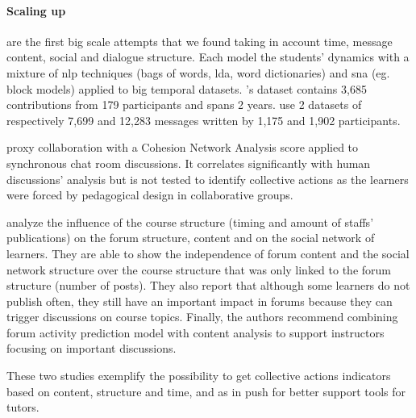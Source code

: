\documentclass[a4paper,twoside]{article}
\begin{document}
\paragraph{Scaling up}

\cite{Dascalu2017,Boroujeni2017} are the first big scale attempts that we found taking in account time, message content, social and dialogue structure.  Each model the students' dynamics with a mixture of \gls{nlp} techniques (bags of words, \gls{lda}, word dictionaries) and \gls{sna} (eg. block models) applied to big temporal datasets.  \cite{Dascalu2017}'s dataset contains  3,685 contributions from 179 participants and spans 2 years.  \cite{Boroujeni2017} use 2 datasets of respectively 7,699 and 12,283 messages written by 1,175 and 1,902 participants.

\cite{Dascalu2017} proxy collaboration with a Cohesion Network Analysis score applied to synchronous chat room discussions.  It correlates significantly with human discussions' analysis but is not tested to identify collective actions as the learners were forced by pedagogical design in collaborative groups.

\cite{Boroujeni2017} analyze the influence of the course structure (timing and amount of staffs' publications) on the forum structure, content and on the social network of learners.  They are able to show the independence of forum content and the social network structure over the course structure that was only linked to the forum structure (number of posts).  They also report that although some learners do not publish often, they still have an important impact in forums because they can trigger discussions on course topics.  Finally, the authors recommend combining forum activity prediction model with content analysis to support instructors focusing on important discussions.

These two studies exemplify the possibility to get collective actions indicators based on content, structure and time, and as in \citep{Ezen2015} push for better support tools for tutors.
\end{document}
